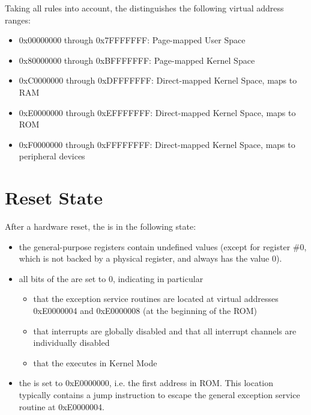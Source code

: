 Taking all rules into account, the \eco distinguishes the following virtual address ranges:
\begin{itemize}
\item 0x00000000 through 0x7FFFFFFF: Page-mapped User Space
\item 0x80000000 through 0xBFFFFFFF: Page-mapped Kernel Space
\item 0xC0000000 through 0xDFFFFFFF: Direct-mapped Kernel Space, maps to RAM
\item 0xE0000000 through 0xEFFFFFFF: Direct-mapped Kernel Space, maps to ROM
\item 0xF0000000 through 0xFFFFFFFF: Direct-mapped Kernel Space, maps to peripheral devices
\end{itemize}

\section{Reset State}

After a hardware reset, the \eco is in the following state:
\begin{itemize}
\item the general-purpose registers contain undefined values (except for register \#0, which is not backed by a physical register, and always has the value 0).
\item all bits of the \psw are set to 0, indicating in particular
\begin{itemize}
\item that the exception service routines are located at virtual addresses 0xE0000004 and 0xE0000008 (at the beginning of the ROM)
\item that interrupts are globally disabled and that all interrupt channels are individually disabled
\item that the \eco executes in Kernel Mode
\end{itemize}
\item the \pc is set to 0xE0000000, i.e. the first address in ROM. This location typically contains a jump instruction to escape the general exception service routine at 0xE0000004.
\end{itemize}
